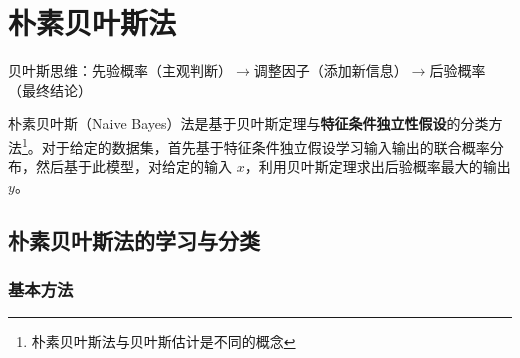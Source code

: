 \chapter{朴素贝叶斯法\label{Ch04}}
贝叶斯思维：先验概率（主观判断）$\rightarrow$调整因子（添加新信息）$\rightarrow$后验概率（最终结论）

朴素贝叶斯（Naive Bayes）法是基于贝叶斯定理与\textbf{特征条件独立性假设}的分类方法\footnote{朴素贝叶斯法与贝叶斯估计是不同的概念}。对于给定的数据集，首先基于特征条件独立假设学习输入输出的联合概率分布，然后基于此模型，对给定的输入 $x$，利用贝叶斯定理求出后验概率最大的输出 $y$。

\section{朴素贝叶斯法的学习与分类}
\subsection*{基本方法}
